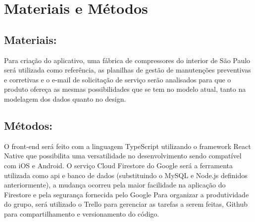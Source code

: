 \documentclass[%
  a4paper,%
  12pt,%
  english,%
  brazilian,%
]{article}
\begin{document}
\section{Materiais e Métodos}%



\subsection{Materiais:}%
Para criação do aplicativo, uma fábrica de compressores do interior de São Paulo será utilizada como referência, as planilhas de gestão de manutenções preventivas e corretivas e o e-mail de solicitação de serviço serão analisados para que o produto ofereça as mesmas possibilidades que se tem no modelo atual, tanto na modelagem dos dados quanto no design.

\subsection{Métodos:}%
O front-end será feito com a linguagem TypeScript utilizando o framework React Native que possibilita uma versatilidade no desenvolvimento sendo compatível com iOS e Android.
O serviço Cloud Firestore do Google será a ferramenta utilizada como api e banco de dados (substituindo o MySQL e Node.js definidos anteriormente), a mudança ocorreu pela maior facilidade na aplicação do Firestore e pela segurança fornecida pelo Google
Para organizar a produtividade do grupo, será utilizado o Trello para gerenciar as tarefas a serem feitas, Github para compartilhamento e versionamento do código. 


\end{document}
